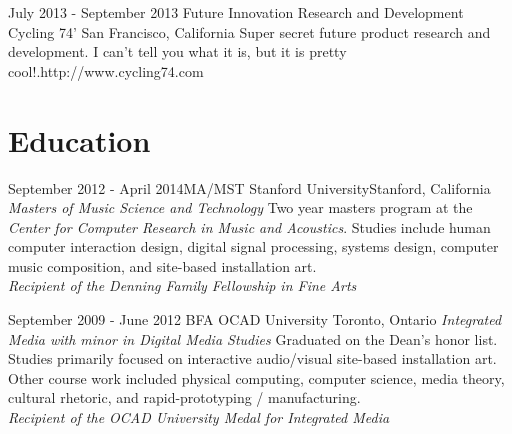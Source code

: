 \documentclass[10pt,a4paper,sans]{moderncv}   %
\begin{document}
\cventry
  {July 2013 - September 2013}
  {Future Innovation Research and Development}
  {Cycling 74'}
  {San Francisco, California}{}
  {Super secret future product research and development. I can't tell you what it is, but it is pretty cool!.\newline{}http://www.cycling74.com}



\section{Education}

\cventry
  {September 2012 - April 2014}{MA/MST}
  {Stanford University}{Stanford, California}
  {\textit{Masters of Music Science and Technology}}
  {Two year masters program at the \textit{Center for Computer Research in Music and Acoustics}.  Studies include human computer interaction design, digital signal processing, systems design, computer music composition, and site-based installation art. \\\textit{Recipient of the Denning Family Fellowship in Fine Arts }}

\cventry
  {September 2009 - June 2012}
  {BFA}
  {OCAD University}
  {Toronto, Ontario}
  {\textit{Integrated Media with minor in Digital Media Studies}}
  {Graduated on the Dean's honor list. Studies primarily focused on interactive audio/visual site-based installation art.  Other course work included physical computing, computer science, media theory, cultural rhetoric, and rapid-prototyping / manufacturing. \\\textit{Recipient of the OCAD University Medal for Integrated Media }}

\end{document}
